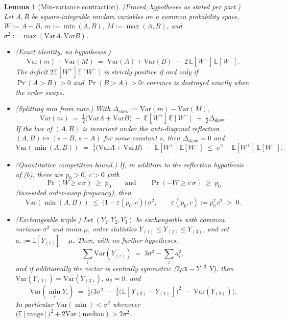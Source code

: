 \documentclass[11pt]{article}
\newtheorem{lemma}[theorem]{Lemma}
\theoremstyle{definition}
\theoremstyle{remark}
\newcommand{\E}{\mathbb{E}}
\newcommand{\Var}{\mathrm{Var}}
\begin{document}
\begin{lemma}[Min-variance contraction]
\label{lem:contraction}
\textup{(Proved; hypotheses as stated per part.)}
Let $A, B$ be square-integrable random variables on a common probability
space, $W := A - B$, $m := \min(A,B)$, $M := \max(A,B)$, and
$\sigma^2 := \max(\Var A, \Var B)$.
\begin{itemize}
\item[(a)] \emph{(Exact identity; no hypotheses.)}
\begin{equation}
\Var(m) + \Var(M) \;=\; \Var(A) + \Var(B) \;-\; 2\,\E[W^+]\,\E[W^-].
\label{eq:pairid}
\end{equation}
The deficit $2\E[W^+]\E[W^-]$ is strictly positive if and only if
$\Pr(A > B) > 0$ and $\Pr(B > A) > 0$: variance is destroyed exactly
when the order swaps.
\item[(b)] \emph{(Splitting min from max.)} With
$\Delta_{\mathrm{skew}} := \Var(m) - \Var(M)$,
\[
\Var(m) \;=\; \tfrac12\big(\Var A + \Var B\big) \;-\; \E[W^+]\,\E[W^-]
\;+\; \tfrac12 \Delta_{\mathrm{skew}} .
\]
If the law of $(A,B)$ is invariant under the anti-diagonal reflection
$(A,B) \mapsto (s - B,\, s - A)$ for some constant $s$, then
$\Delta_{\mathrm{skew}} = 0$ and
\[
\Var(\min(A,B)) \;=\; \tfrac12\big(\Var A + \Var B\big)
\;-\; \E[W^+]\,\E[W^-] \;\leq\; \sigma^2 - \E[W^+]\,\E[W^-].
\]
\item[(c)] \emph{(Quantitative competition bound.)} If, in addition to
the reflection hypothesis of (b), there are $p_0 > 0$, $c > 0$ with
\[
\Pr(W \geq c\,\sigma) \;\geq\; p_0
\qquad\text{and}\qquad
\Pr(-W \geq c\,\sigma) \;\geq\; p_0
\]
(two-sided order-swap frequency), then
\[
\Var(\min(A,B)) \;\leq\; \big(1 - \varepsilon(p_0, c)\big)\,\sigma^2,
\qquad
\varepsilon(p_0, c) := p_0^2\, c^2 \;>\; 0 .
\]
\item[(d)] \emph{(Exchangeable triple.)} Let $(Y_1, Y_2, Y_3)$ be
exchangeable with common variance $\sigma^2$ and mean $\mu$, order
statistics $Y_{(1)} \leq Y_{(2)} \leq Y_{(3)}$, and set
$a_i := \E[Y_{(i)}] - \mu$. Then, with no further hypotheses,
\[
\textstyle\sum_i \Var(Y_{(i)}) \;=\; 3\sigma^2 - \sum_i a_i^2 ,
\]
and if additionally the vector is centrally symmetric
($2\mu\mathbf{1} - Y \overset{d}{=} Y$), then $\Var(Y_{(1)}) =
\Var(Y_{(3)})$, $a_2 = 0$, and
\[
\Var(\min_i Y_i) \;=\; \tfrac12\Big( 3\sigma^2
\;-\; \tfrac12\big(\E[\,Y_{(3)} - Y_{(1)}\,]\big)^2
\;-\; \Var(Y_{(2)}) \Big) .
\]
In particular $\Var(\min) < \sigma^2$ whenever
$\big(\E[\mathrm{range}]\big)^2 + 2\Var(\mathrm{median}) > 2\sigma^2$.
\end{itemize}
\end{lemma}
\end{document}
